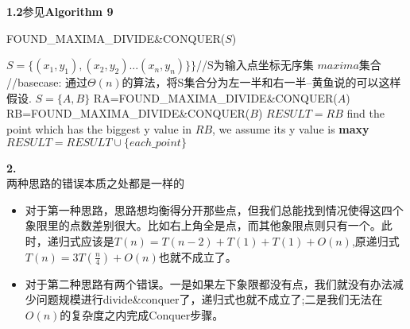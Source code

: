 \documentclass[twocolumn]{ctexart}
\begin{document}
\noindent \textbf{1.2}参见\textbf{Algorithm 9}\\
\begin{algorithm}[htbp]
	\caption{FOUND\_MAXIMA\_DIVIDE\&CONQUER($S$)}
	\begin{algorithmic}[1]
		\REQUIRE $S=\{(x_1,y_1),(x_2,y_2)...(x_n,y_n)\}\}$//S为输入点坐标无序集
		\ENSURE $maxima$集合
		\STATE //basecase:
			\RETURN {$\varnothing$}
		\ENDIF
		\STATE 通过$\Theta(n)$的算法，将S集合分为左一半和右一半--黄鱼说的可以这样假设.
		\STATE $S=\{A,B\}$
		\STATE RA=FOUND\_MAXIMA\_DIVIDE\&CONQUER($A$)
		\STATE RB=FOUND\_MAXIMA\_DIVIDE\&CONQUER($B$)
		\STATE $RESULT=RB$
		\STATE find the point which has the biggest y value in $RB$, we assume its y value is \textbf{maxy}
				\STATE $RESULT=RESULT\cup \{each\_point\}$
			\ENDIF
		\ENDFOR
	\end{algorithmic}
\end{algorithm}

\noindent \textbf{2.}\\
\indent 两种思路的错误本质之处都是一样的
\begin{itemize}
\item 对于第一种思路，思路想均衡得分开那些点，但我们总能找到情况使得这四个象限里的点数差别很大。比如右上角全是点，而其他象限点则只有一个。此时，递归式应该是$T(n)=T(n-2)+T(1)+T(1)+O(n)$,原递归式$T(n)=3T(\frac{n}{4})+O(n)$也就不成立了。\\

\item 对于第二种思路有两个错误。一是如果左下象限都没有点，我们就没有办法减少问题规模进行divide\&conquer了，递归式也就不成立了;二是我们无法在$O(n)$的复杂度之内完成Conquer步骤。\\
\end{itemize}
\end{document}
